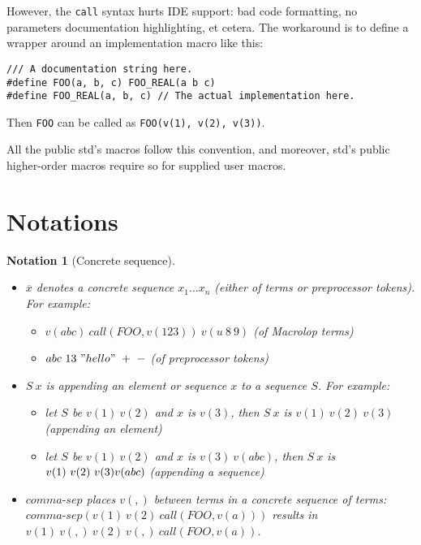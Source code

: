 \documentclass[12pt]{article}
\theoremstyle{break}
\newtheorem{notation}{Notation}
\begin{document}
However, the \texttt{call} syntax hurts IDE support: bad code formatting, no parameters
documentation highlighting, et cetera. The workaround is to define a wrapper around
an implementation macro like this:

\begin{verbatim}
/// A documentation string here.
#define FOO(a, b, c) FOO_REAL(a b c)
#define FOO_REAL(a, b, c) // The actual implementation here.
\end{verbatim}

Then \texttt{FOO} can be called as \texttt{FOO(v(1), v(2), v(3))}.

All the public std's macros follow this convention, and moreover, std's public
higher-order macros require so for supplied user macros.

\section{Notations}

\begin{notation}[Concrete sequence]
    \begin{itemize}
        \item $\overline{x}$ denotes a concrete sequence $x_1 \ldots x_n$ (either of terms
        or preprocessor tokens). For example:
        \begin{itemize}
            \item $v(abc) \ call(FOO, v(123)) \ v(u \ 8 \ 9)$ (of Macrolop terms)
            \item $abc \ 13 \ "hello" \ + \ -$ (of preprocessor tokens)
        \end{itemize}
        \item $S \ x$ is appending an element or sequence $x$ to a sequence $S$. For
        example:
        \begin{itemize}
            \item let $S$ be $v(1) \ v(2)$ and $x$ is $v(3)$, then $S \ x$ is $v(1) \ v(2) \ v(3)$
            (appending an element)
            \item let $S$ be $v(1) \ v(2)$ and $x$ is $v(3) \ v(abc)$, then $S \ x$ is $v(1) \ v(2) \ v(3) \\ v(abc)$
            (appending a sequence)
        \end{itemize}
        \item $comma\mbox{-}sep$ places $v(,)$ between terms in a concrete sequence of terms:\\
        $comma\mbox{-}sep(v(1) \ v(2) \ call(FOO, v(a)))$ results in\\
        $v(1) \ v(,) \ v(2) \ v(,) \ call(FOO, v(a))$.
    \end{itemize}
\end{notation}
\end{document}
